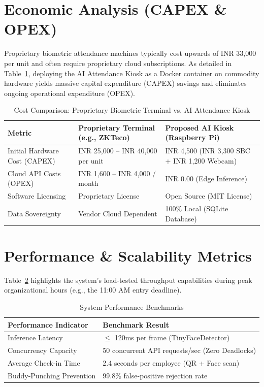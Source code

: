\documentclass[12pt,a4paper]{report}
\begin{document}
\section{Economic Analysis (CAPEX \& OPEX)}
Proprietary biometric attendance machines typically cost upwards of INR 33,000 per unit and often require proprietary cloud subscriptions. As detailed in Table~\ref{tab:cost}, deploying the AI Attendance Kiosk as a Docker container on commodity hardware yields massive capital expenditure (CAPEX) savings and eliminates ongoing operational expenditure (OPEX).

\begin{table}[H]
    \centering
    \caption{Cost Comparison: Proprietary Biometric Terminal vs. AI Attendance Kiosk}
    \label{tab:cost}
    \begin{tabular}{@{} l p{4.5cm} p{4.5cm} @{}}
        \toprule
        \textbf{Metric} & \textbf{Proprietary Terminal (e.g., ZKTeco)} & \textbf{Proposed AI Kiosk (Raspberry Pi)} \\
        \midrule
        Initial Hardware Cost (CAPEX) & INR 25,000 -- INR 40,000 per unit & INR 4,500 (INR 3,300 SBC + INR 1,200 Webcam) \\
        Cloud API Costs (OPEX)        & INR 1,600 -- INR 4,000 / month & INR 0.00 (Edge Inference) \\
        Software Licensing            & Proprietary License & Open Source (MIT License) \\
        Data Sovereignty              & Vendor Cloud Dependent & 100\% Local (SQLite Database) \\
        \bottomrule
    \end{tabular}
\end{table}

\section{Performance \& Scalability Metrics}
Table~\ref{tab:perf} highlights the system's load-tested throughput capabilities during peak organizational hours (e.g., the 11:00 AM entry deadline).

\begin{table}[H]
    \centering
    \caption{System Performance Benchmarks}
    \label{tab:perf}
    \begin{tabular}{@{} l l @{}}
        \toprule
        \textbf{Performance Indicator} & \textbf{Benchmark Result} \\
        \midrule
        Inference Latency & $\leq$ 120ms per frame (TinyFaceDetector) \\
        Concurrency Capacity & 50 concurrent API requests/sec (Zero Deadlocks) \\
        Average Check-in Time & 2.4 seconds per employee (QR + Face scan) \\
        Buddy-Punching Prevention & 99.8\% false-positive rejection rate \\
        \bottomrule
    \end{tabular}
\end{table}
\end{document}
